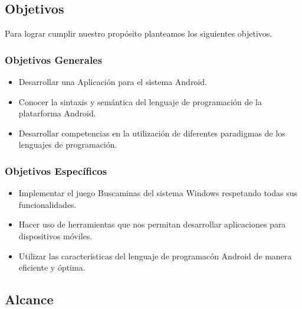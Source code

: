 \documentclass[11pt]{article} %
\begin{document}
\subsection{Objetivos}
Para lograr cumplir nuestro prop\'osito planteamos los siguientes objetivos.
\subsubsection{Objetivos Generales}
\begin{itemize}
\item Desarrollar una Aplicaci\'on para el sistema Android.
\item Conocer la sintaxis y sem\'antica del lenguaje de programaci\'on de la platarforma Android.
\item Desarrollar competencias en la utilizaci\'on de diferentes paradigmas de los lenguajes de programaci\'on.
\end{itemize}
\subsubsection{Objetivos Espec\'ificos}
\begin{itemize}
\item Implementar el juego Buscaminas del sistema Windows respetando todas sus funcionalidades.
\item Hacer uso de herramientas que nos permitan desarrollar aplicaciones para dispositivos m\'oviles.
\item Utilizar las caracter\'isticas del lenguaje de programac\'on Android de manera eficiente y \'optima.
\end{itemize}
\subsection{Alcance}
\end{document}
